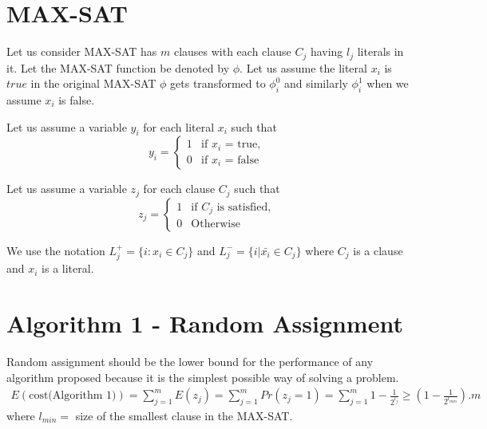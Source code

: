 \documentclass[10pt]{article}
\begin{document}
\maketitle
\section{MAX-SAT}
Let us consider MAX-SAT has $m$ clauses with each clause $C_j$ having $l_j$ literals in it. Let the MAX-SAT
function be denoted by $\phi$. Let us assume the literal $x_i$ is $true$ in the original MAX-SAT $\phi$ gets transformed to  $\phi_i^0$ 
and similarly $\phi_i^1$ when we assume $x_i$ is false.

Let us assume a variable $y_i$ for each literal $x_i$ such that
\begin{equation}
y_i = \left\{
\begin{array}{rl}
1 & \mbox{if $x_i$ = true}, \\
0 & \mbox{if $x_i$ = false} 

\end{array} \right. \end{equation}

Let us assume a variable $z_j$ for each clause $C_j$ such that
\begin{equation}
z_j = \left\{
\begin{array}{rl}
1 & \mbox{if $C_j$ is satisfied}, \\
0 & \mbox{Otherwise } 
\end{array} \right. 
\end{equation}

We use the notation $L_j^+ = \{ i : x_i \in C_j \}$ and $L_j^- = \{ i | \bar{x_i} \in C_j \}$ where $C_j$ is a clause and $x_i$ is a literal.

\section{Algorithm 1 - Random Assignment}
Random assignment should be the lower bound for the performance of any algorithm proposed because 
it is the simplest possible way of solving a problem. 
\begin{eqnarray}
E(\mbox{cost(Algorithm 1)}) =  \sum_{j=1}^m E(z_j) = \sum_{j=1}^m Pr(z_j = 1) = \sum_{j=1}^m 1 - \frac{1}{2^{l_j}} \geq (1 - \frac{1}{2^{l_{min}}}).m \nonumber
\end{eqnarray}
where $l_{min} =$ size of the smallest clause in the MAX-SAT.
\end{document}
